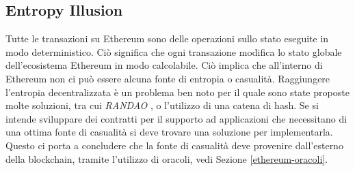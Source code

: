 \subsection*{Entropy Illusion}
Tutte le transazioni su Ethereum sono delle operazioni sullo stato eseguite in modo deterministico. Ciò significa che ogni transazione modifica lo stato globale dell'ecosistema Ethereum in modo calcolabile. Ciò implica che all'interno di Ethereum non ci può essere alcuna fonte di entropia o casualità. Raggiungere l'entropia decentralizzata è un problema ben noto per il quale sono state proposte molte soluzioni, tra cui \textit{RANDAO} \cite{white-paper-randao:randao.org}, o l'utilizzo di una catena di hash. Se si intende sviluppare dei contratti per il supporto ad applicazioni che necessitano di una ottima fonte di casualità si deve trovare una soluzione per implementarla. Questo ci porta a concludere che la fonte di casualità deve provenire dall'esterno della blockchain, tramite l'utilizzo di oracoli, vedi Sezione \ref{ethereum-oracoli}.

